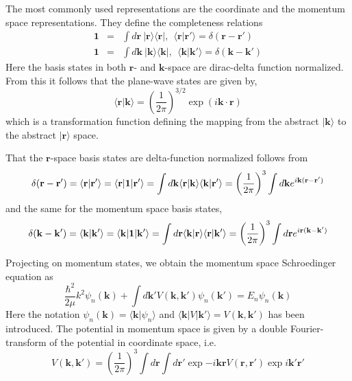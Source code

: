 \documentclass[graybox,sectrefs,envcountresetchap,open=right]{svmonodo}
\begin{document}
The most commonly used representations are the coordinate and
the momentum space representations. They define the completeness relations 
\begin{eqnarray*}
 \mathbf{1}&=&  \int d\mathbf{r} \:\vert\mathbf{r} \rangle \langle \mathbf{r}\vert, \:\: \langle  \mathbf{r}\vert  \mathbf{r'} \rangle = \delta ( \mathbf{r}-\mathbf{r'}) \\
\mathbf{1} &=& \int d\mathbf{k} \:\vert  \mathbf{k}\rangle \langle \mathbf{k}\vert, \:\: \langle\mathbf{k}\vert  \mathbf{k'} \rangle = \delta ( \mathbf{k}-\mathbf{k'}) 
\end{eqnarray*}
Here the basis states in  both $\mathbf{r}$- and $\mathbf{k}$-space are dirac-delta 
function normalized. From this it follows that the plane-wave states are given by,
\[
\langle\mathbf{r}\vert\mathbf{k} \rangle =\left(\frac{1}{2\pi}\right)^{3/2}\exp\left(i\mathbf{k\cdot r} \right)
\]
which is a transformation function defining the mapping from the abstract 
$\vert\mathbf{k}\rangle$ to the abstract $\vert\mathbf{r}\rangle $ space.


That the $\mathbf{r}$-space basis states are 
delta-function normalized follows from 
\[
\delta ( \mathbf{r}-\mathbf{r'}) = \langle \mathbf{r} \vert \mathbf{r}'\rangle = \langle \mathbf{r} \vert \mathbf{1} \vert \mathbf{r}'\rangle = \int d\mathbf{k} \langle \mathbf{r}\vert \mathbf{k} \rangle \langle \mathbf{k}\vert \mathbf{r}' \rangle =\left( {1\over 2\pi}\right)^3 \int d\mathbf{k} e^{i \mathbf{k}(\mathbf{r} - \mathbf{r}')} 
\]
and the same for the momentum space basis states,
\[
\delta ( \mathbf{k}-\mathbf{k'}) = \langle \mathbf{k} \vert \mathbf{k}'\rangle = \langle \mathbf{k} \vert \mathbf{1} \vert \mathbf{k}'\rangle =\int d\mathbf{r} \langle \mathbf{k}\vert \mathbf{r} \rangle \langle \mathbf{r}\vert \mathbf{k}' \rangle = \left( {1\over 2\pi}\right)^3 \int d\mathbf{r} e^{i \mathbf{r}(\mathbf{k} - \mathbf{k}')} 
\]


Projecting  on momentum states, we obtain the momentum space Schroedinger equation as
\begin{equation}
\frac{\hbar^2}{2\mu}k^2\psi_n(\mathbf{k})+\int d\mathbf{k'}V(\mathbf{k}, \mathbf{k'}) \psi_n(\mathbf{k'})=E_n \psi_n(\mathbf{k})
\label{eq:momspace1}
\end{equation}
Here the notation $\psi_n(\mathbf{k}) =\langle\mathbf{k}\vert\psi_n\rangle $ and 
$\langle\mathbf{k}\vert V\vert\mathbf{k}' \rangle =V(\mathbf{k}, \mathbf{k'})$ has been introduced.
The potential in momentum space is given by a double Fourier-transform 
of the potential in coordinate space, i.e.
\[ 
V(\mathbf{k},\mathbf{k'}) = \left( \frac{1}{2\pi}\right)^3\int d\mathbf{r}\int d\mathbf{r}'\exp{-i\mathbf{kr}}V(\mathbf{r},\mathbf{r}')\exp{i\mathbf{k}'\mathbf{r}'}  
\]
\end{document}

